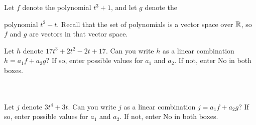 \endedxproblem



Let $f$ denote the polynomial $t^3  + 1$, and let $g$ denote the

polynomial $t^2 - t$.  Recall that the set of polynomials is a vector space over $\mathbb R$, so $f$ and $g$
are vectors in that vector space.  

Let $h$ denote $17t^3 + 2t^2 - 2t + 17$.
Can you write $h$  as a linear combination $h = a_1 f + a_2 g$?  If so, enter possible values for $a_1$ and
$a_2$.  If not, enter No in both boxes.  

\\
\\


Let $j$ denote $3t^4 + 3t$.
Can you write $j$  as a linear combination $j = a_1 f + a_2 g$?  If so, enter possible values for $a_1$ and
$a_2$.  If not, enter No in both boxes.  

\\
\\


